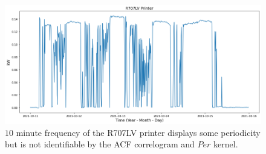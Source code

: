 
\begin{figure}[H]
\centering
\graphicspath{ {./images/} }
\includegraphics[scale=0.49]{images/r707lv_printer.png}
\caption{$10$ minute frequency of the R707LV printer displays some periodicity but is not identifiable by the ACF correlogram and $Per$ kernel.}
\label{fig:fig18}
\end{figure}